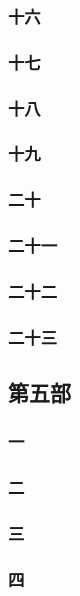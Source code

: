 \subsubsection*{十六}
\subsubsection*{十七}
\subsubsection*{十八}
\subsubsection*{十九}
\subsubsection*{二十}
\subsubsection*{二十一}
\subsubsection*{二十二}
\subsubsection*{二十三}







\subsection*{第五部}




\subsubsection*{一}
\subsubsection*{二}
\subsubsection*{三}
\subsubsection*{四}
